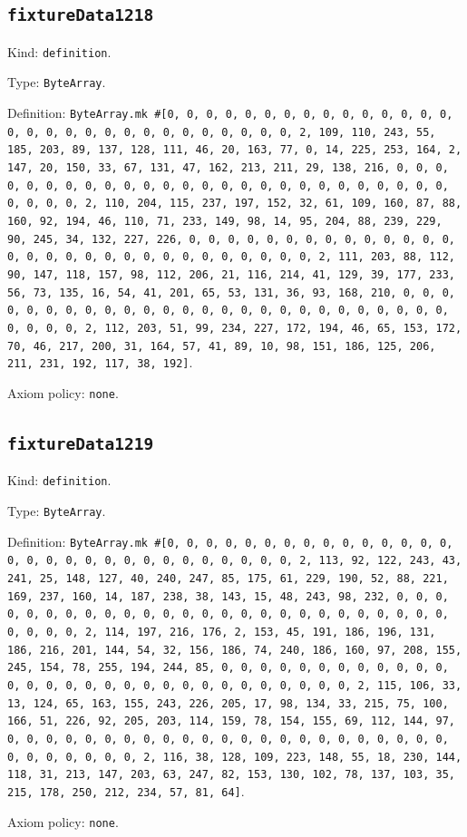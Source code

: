 \documentclass[11pt]{article}
\begin{document}
\subsection*{\texttt{fixtureData1218}}
\noindent Kind: \texttt{definition}.\par
\noindent Type: \texttt{ByteArray}.\par
\noindent Definition: \texttt{ByteArray.mk \#[0, 0, 0, 0, 0, 0, 0, 0, 0, 0, 0, 0, 0, 0, 0, 0, 0, 0, 0, 0, 0, 0, 0, 0, 0, 0, 0, 0, 0, 0, 2, 109, 110, 243, 55, 185, 203, 89, 137, 128, 111, 46, 20, 163, 77, 0, 14, 225, 253, 164, 2, 147, 20, 150, 33, 67, 131, 47, 162, 213, 211, 29, 138, 216, 0, 0, 0, 0, 0, 0, 0, 0, 0, 0, 0, 0, 0, 0, 0, 0, 0, 0, 0, 0, 0, 0, 0, 0, 0, 0, 0, 0, 0, 0, 2, 110, 204, 115, 237, 197, 152, 32, 61, 109, 160, 87, 88, 160, 92, 194, 46, 110, 71, 233, 149, 98, 14, 95, 204, 88, 239, 229, 90, 245, 34, 132, 227, 226, 0, 0, 0, 0, 0, 0, 0, 0, 0, 0, 0, 0, 0, 0, 0, 0, 0, 0, 0, 0, 0, 0, 0, 0, 0, 0, 0, 0, 0, 0, 2, 111, 203, 88, 112, 90, 147, 118, 157, 98, 112, 206, 21, 116, 214, 41, 129, 39, 177, 233, 56, 73, 135, 16, 54, 41, 201, 65, 53, 131, 36, 93, 168, 210, 0, 0, 0, 0, 0, 0, 0, 0, 0, 0, 0, 0, 0, 0, 0, 0, 0, 0, 0, 0, 0, 0, 0, 0, 0, 0, 0, 0, 0, 0, 2, 112, 203, 51, 99, 234, 227, 172, 194, 46, 65, 153, 172, 70, 46, 217, 200, 31, 164, 57, 41, 89, 10, 98, 151, 186, 125, 206, 211, 231, 192, 117, 38, 192]}.\par
\noindent Axiom policy: \texttt{none}.\par
\subsection*{\texttt{fixtureData1219}}
\noindent Kind: \texttt{definition}.\par
\noindent Type: \texttt{ByteArray}.\par
\noindent Definition: \texttt{ByteArray.mk \#[0, 0, 0, 0, 0, 0, 0, 0, 0, 0, 0, 0, 0, 0, 0, 0, 0, 0, 0, 0, 0, 0, 0, 0, 0, 0, 0, 0, 0, 0, 2, 113, 92, 122, 243, 43, 241, 25, 148, 127, 40, 240, 247, 85, 175, 61, 229, 190, 52, 88, 221, 169, 237, 160, 14, 187, 238, 38, 143, 15, 48, 243, 98, 232, 0, 0, 0, 0, 0, 0, 0, 0, 0, 0, 0, 0, 0, 0, 0, 0, 0, 0, 0, 0, 0, 0, 0, 0, 0, 0, 0, 0, 0, 0, 2, 114, 197, 216, 176, 2, 153, 45, 191, 186, 196, 131, 186, 216, 201, 144, 54, 32, 156, 186, 74, 240, 186, 160, 97, 208, 155, 245, 154, 78, 255, 194, 244, 85, 0, 0, 0, 0, 0, 0, 0, 0, 0, 0, 0, 0, 0, 0, 0, 0, 0, 0, 0, 0, 0, 0, 0, 0, 0, 0, 0, 0, 0, 0, 2, 115, 106, 33, 13, 124, 65, 163, 155, 243, 226, 205, 17, 98, 134, 33, 215, 75, 100, 166, 51, 226, 92, 205, 203, 114, 159, 78, 154, 155, 69, 112, 144, 97, 0, 0, 0, 0, 0, 0, 0, 0, 0, 0, 0, 0, 0, 0, 0, 0, 0, 0, 0, 0, 0, 0, 0, 0, 0, 0, 0, 0, 0, 0, 2, 116, 38, 128, 109, 223, 148, 55, 18, 230, 144, 118, 31, 213, 147, 203, 63, 247, 82, 153, 130, 102, 78, 137, 103, 35, 215, 178, 250, 212, 234, 57, 81, 64]}.\par
\noindent Axiom policy: \texttt{none}.\par
\end{document}
